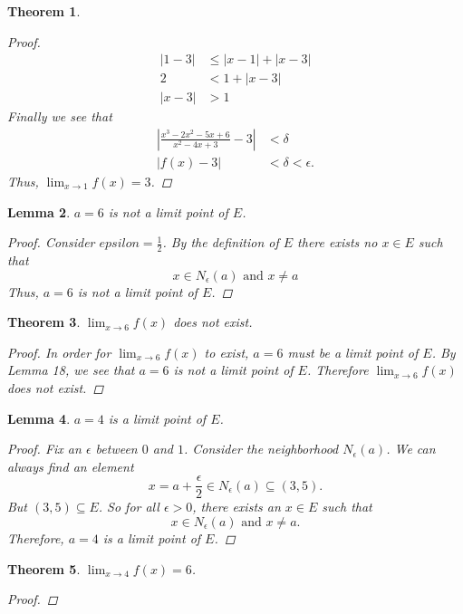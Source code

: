 \documentclass{amsart}
\newtheorem{theorem}{Theorem}
\newtheorem{lemma}[theorem]{Lemma}
\begin{document}
\begin{enumerate}[1.]
\begin{theorem}
\begin{proof}
\begin{align*}
            |1 - 3| &\leq |x - 1| + |x - 3| \\
            2 &< 1 + |x - 3| \\
            |x - 3| &> 1
        \end{align*}
        Finally we see that 
        \begin{align*}
            \left| \frac{x^3-2x^2-5x+6}{x^2-4x+3} - 3 \right| &< \delta \\
            | f(x) - 3 | &< \delta < \epsilon.
        \end{align*}
        Thus, $\displaystyle \lim_{x \to 1} f(x) = 3$.
    \end{proof}
\end{theorem}
\begin{lemma}
    $a = 6$ is not a limit point of $E$.
    \begin{proof}
        Consider $epsilon = \frac{1}{2}$. By the definition of $E$ there exists no $x \in E$ such that
        \[
            x \in N_\epsilon(a) \text{ and } x \neq a    
        \]
        Thus, $a = 6$ is not a limit point of $E$.
    \end{proof}
\end{lemma}
\newpage
\begin{theorem}
    $\displaystyle \lim_{x \to 6} f(x)$ does not exist.
    \begin{proof}
        In order for $\displaystyle \lim_{x \to 6} f(x)$ to exist, $a = 6$ must be a limit point
        of $E$. By Lemma 18, we see that $a = 6$ is not a limit point of $E$. Therefore 
        $\displaystyle \lim_{x \to 6} f(x)$ does not exist.
    \end{proof}
\end{theorem}
\begin{lemma}
    $a = 4$ is a limit point of $E$.
    \begin{proof}
        Fix an $\epsilon$ between $0$ and $1$. Consider the neighborhood $N_\epsilon(a)$. We can always
        find an element
        \[
            x = a + \frac{\epsilon}{2} \in N_\epsilon(a) \subseteq (3, 5).
        \]
        But $(3, 5) \subseteq E$. So for all $\epsilon > 0$, there exists an $x \in E$ such that 
        \[
            x \in N_\epsilon(a) \text{ and } x \neq a.    
        \]
        Therefore, $a = 4$ is a limit point of $E$.
    \end{proof}
\end{lemma}
\begin{theorem}
    $\displaystyle \lim_{x \to 4} f(x) = 6$.
    \begin{proof}

\end{proof}
\end{theorem}
\end{enumerate}
\end{document}
